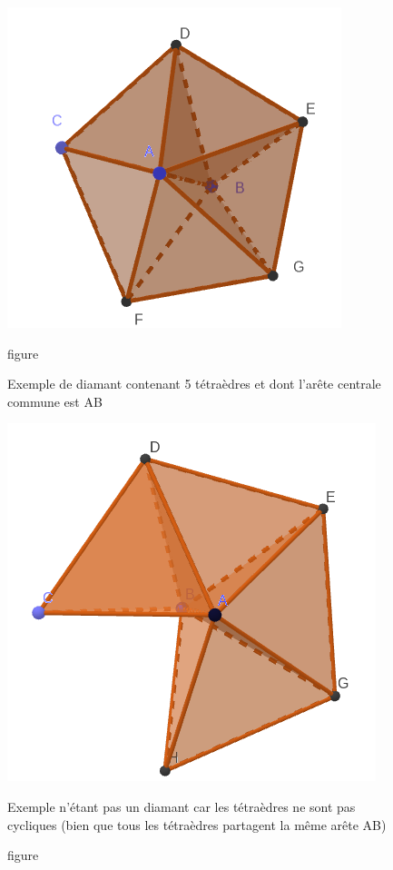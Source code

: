 \documentclass[a4paper,11pt,openany]{article}
\begin{document}
\begin{figure}[H]
\centering
\begin{minipage}{.5\textwidth}
  \centering
  \includegraphics[scale=0.3]{Images/full_diamond}
  \caption{figure}{Exemple de diamant contenant 5 tétraèdres et dont l'arête centrale commune est AB}
  \label{fig:full_diamond2}
\end{minipage}%
\begin{minipage}{.5\textwidth}
  \centering
  \includegraphics[scale=0.26]{Images/not_full_diamond}
  \caption{figure}{Exemple n'étant pas un diamant car les tétraèdres ne sont pas cycliques (bien que tous les tétraèdres partagent la même arête AB)}
  \label{fig:not_full_diamond}
\end{minipage}
\end{figure}
\end{document}
